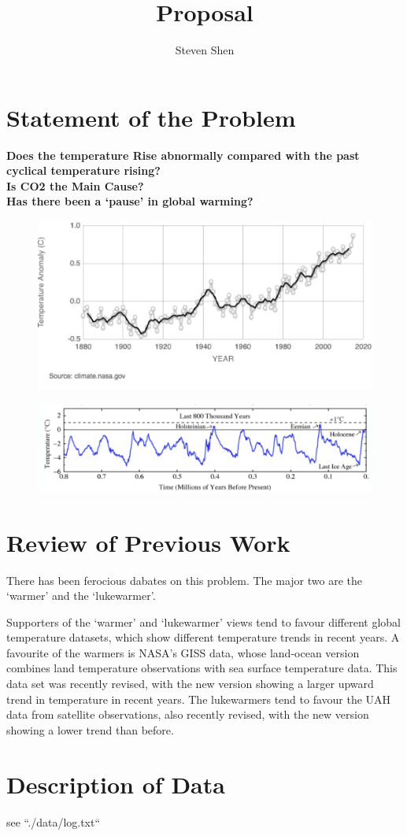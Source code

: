 \documentclass[11pt,a4paper]{paper}
\author{Steven Shen \quad \quad}
\title{Proposal}
\begin{document}
\maketitle

\section{Statement of the Problem}
\textbf{Does the temperature Rise abnormally compared with the past cyclical temperature rising?}  \\
\textbf{Is CO2 the Main Cause?} \\
\textbf{Has there been a ‘pause’ in global warming?}\\


\begin{figure}[!htb]
\centering
\includegraphics[scale=.30]{pic2.png}
\end{figure}

\begin{figure}[!htb]
\centering
\includegraphics[scale=.40]{pic1.png}
\end{figure}

\section{Review of Previous Work}
There has been ferocious dabates on this problem. The major two are the `warmer' and the `lukewarmer'.


Supporters of the `warmer’ and `lukewarmer’ views tend to favour different global temperature datasets, which show different temperature trends in recent years.  A favourite of the warmers is NASA’s GISS data, whose land-ocean version combines land temperature observations with sea surface temperature data. This data set was recently revised, with the new version showing a larger upward trend in temperature in recent years. The lukewarmers tend to favour the UAH data from satellite observations, also recently revised, with the new version showing a lower trend than before.





\section{Description of Data}
see ``./data/log.txt``
\end{document}
